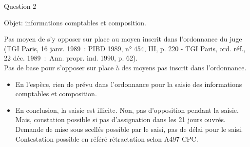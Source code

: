 


\begin{frame}{Question 2}

Objet: informations comptables et composition.

\begin{block}{}
Pas moyen de s’y opposer sur place au moyen inscrit dans l’ordonnance du juge
(TGI Paris, 16 janv. 1989 : PIBD 1989, n° 454, III, p. 220 
- TGI Paris, ord. réf., 22 déc. 1989 : Ann. propr. ind. 1990, p. 62).\\
Pas de base pour s'opposer sur place à des moyens pas inscrit dans l'ordonnance.
\end{block}

\begin{itemize}
    \item En l'espèce, rien de prévu dans l'ordonnance pour la saisie
    des informations comptables et composition.
    

    \item En conclusion, la saisie est illicite. Non,
    pas d'opposition pendant la saisie. Mais, constation
    possible si pas d'assignation dans les 21 jours ouvrés.
    Demande de mise sous scellés possible par le saisi,
     pas de délai pour le saisi. Contestation
    possible en référé rétractation selon A497 CPC.
\end{itemize}

\end{frame}



